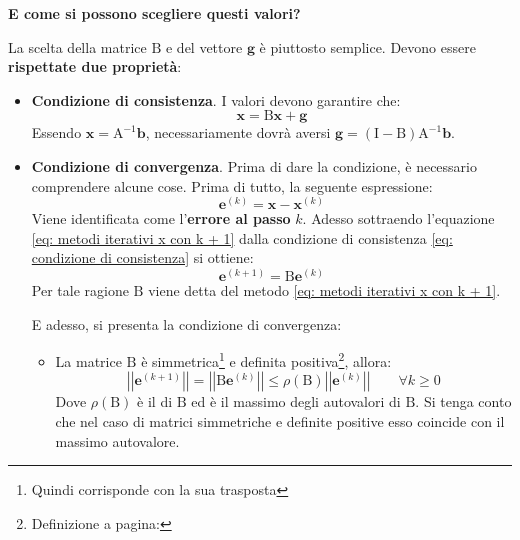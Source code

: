 \begin{flushleft}
    \textcolor{Green3}{ \textbf{E come si possono scegliere questi valori?}}
\end{flushleft}
La scelta della matrice $\mathrm{B}$ e del vettore $\mathbf{g}$ è piuttosto semplice. Devono essere \textbf{rispettate due proprietà}:
\begin{itemize}
    \item \textbf{Condizione di consistenza}. I valori devono garantire che:
    \begin{equation}\label{eq: condizione di consistenza}
        \mathbf{x} = \mathrm{B}\mathbf{x} + \mathbf{g}
    \end{equation}
    Essendo $\mathbf{x} = \mathrm{A}^{-1}\mathbf{b}$, necessariamente dovrà aversi $\mathbf{g} = \left(\mathrm{I} - \mathrm{B}\right) \mathrm{A}^{-1} \mathbf{b}$. 

    \item \textbf{Condizione di convergenza}. Prima di dare la condizione, è necessario comprendere alcune cose. Prima di tutto, la seguente espressione:
    \begin{equation*}
        \mathbf{e}^{\left(k\right)} = \mathbf{x} - \mathbf{x}^{\left(k\right)}
    \end{equation*}
    Viene identificata come l'\textbf{errore al passo} $k$. Adesso sottraendo l'equazione \ref{eq: metodi iterativi x con k + 1} dalla condizione di consistenza \ref{eq: condizione di consistenza} si ottiene:
    \begin{equation*}
        \mathbf{e}^{\left(k+1\right)} = \mathrm{B}\mathbf{e}^{\left(k\right)}
    \end{equation*}
    Per tale ragione $\mathrm{B}$ viene detta  del metodo \ref{eq: metodi iterativi x con k + 1}.

    E adesso, si presenta la condizione di convergenza:
    \begin{itemize}
        \item La matrice $\mathrm{B}$ è simmetrica\footnote{Quindi corrisponde con la sua trasposta} e definita positiva\footnote{Definizione a pagina: \pageref{matrice definita positiva}}, allora:
        \begin{equation}
            \left|\left| \mathbf{e}^{\left(k+1\right)} \right|\right| 
            = 
            \left|\left| \mathrm{B}\mathbf{e}^{\left(k\right)} \right|\right|
            \le
            \rho\left(\mathrm{B}\right)
            \left|\left| \mathbf{e}^{\left(k\right)} \right|\right|
            \hspace{2em}
            \forall k \ge 0
        \end{equation}
        Dove $\rho\left(\mathrm{B}\right)$ è il  di $\mathrm{B}$ ed è il massimo degli autovalori di $\mathrm{B}$. Si tenga conto che nel caso di matrici simmetriche e definite positive esso coincide con il massimo autovalore.


\end{itemize}
\end{itemize}

